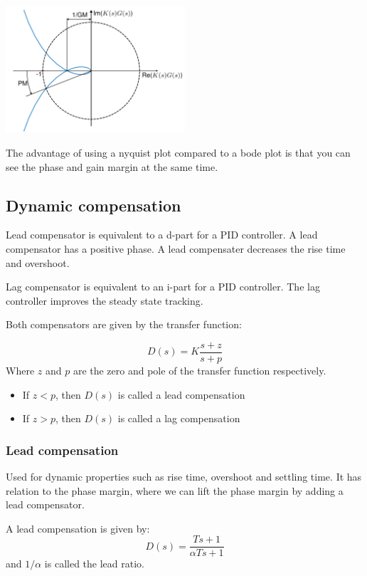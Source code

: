 \begin{center}
	\includegraphics[width=0.5\textwidth]{Images/nyquist.png}
\end{center}

The advantage of using a nyquist plot compared to a bode plot is that you can see
the phase and gain margin at the same time.

\subsection{Dynamic compensation}

Lead compensator is equivalent to a d-part for a PID controller.
A lead compensator has a positive phase. A lead compensater decreases
the rise time and overshoot.

Lag compensator is equivalent to an i-part for a PID controller.
The lag controller improves the steady state tracking.

Both compensators are given by the transfer function:

$$ D(s) = K \frac{s + z}{s + p} $$
Where $z$ and $p$ are the zero and pole of the transfer function respectively.

\begin{itemize}
	\item {If $z<p$, then $D(s)$ is called a lead compensation}
	      \item{If $z>p$, then $D(s)$ is called a lag compensation}
\end{itemize}

\subsubsection{Lead compensation}

Used for dynamic properties such as rise time, overshoot and settling time. It has relation
to the phase margin, where we can lift the phase margin by adding a lead compensator.

A lead compensation is given by:
$$D(s) = \frac{Ts+1}{\alpha Ts+1}$$
and $1/\alpha$ is called the lead ratio.

